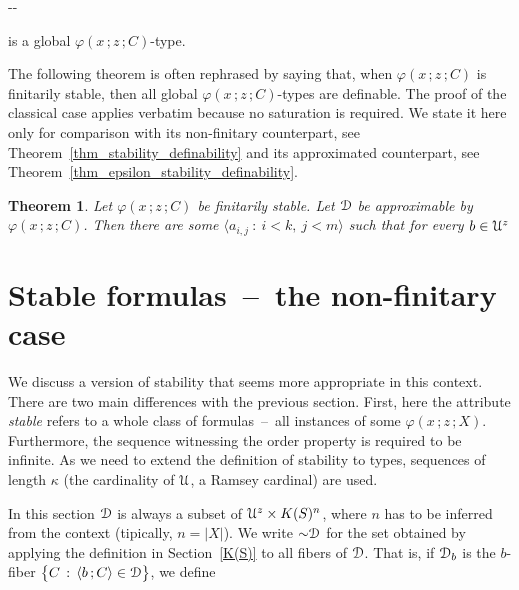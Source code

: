 \documentclass{amsproc}
\newcounter{thm}
\theoremstyle{mio}
\newtheorem{theorem}[thm]{Theorem}\tcolorboxenvironment{theorem}{mythm}
\begin{document}
  \noindent\kern-\kern-

is a global $\varphi(x\,;z\,;C)$-type.\smallskip

The following theorem is often rephrased by saying that, when $\varphi(x\,;z\,;C)$ is finitarily stable, then all global $\varphi(x\,;z\,;C)$-types are definable.
The proof of the classical case applies verbatim because no saturation is required.
We state it here only for comparison with its non-finitary counterpart, see Theorem~\ref{thm_stability_definability} and its approximated counterpart, see Theorem~\ref{thm_epsilon_stability_definability}.

\begin{theorem}
  Let $\varphi(x\,;z\,;C)$ be finitarily stable.
  Let ${\EuScript D}$ be approximable by $\varphi(x\,;z\,;C)$.
  Then there are some $\langle a_{i,j}\ :\ i< k,\ j<m\rangle$ such that for every $b\in{\EuScript U}^z$\medskip

\end{theorem}


\section{Stable formulas~--~the non-finitary case}
\def\medrel#1{\parbox{5ex}{\hfil $#1$}}
\def\ceq#1#2#3{\parbox[t]{22ex}{$\displaystyle #1$}\medrel{#2}{$\displaystyle #3$}}

We discuss a version of stability that seems more appropriate in this context.
There are two main differences with the previous section.
First, here the attribute \textit{stable\/} refers to a whole class of formulas~--~all instances of some $\varphi(x\,;z\,;X)$.
Furthermore, the sequence witnessing the order property is required to be infinite.
As we need to extend the definition of stability to types, sequences of length $\kappa$ (the cardinality of ${\EuScript U}$, a Ramsey cardinal) are used.

In this section  ${\EuScript D}$ is always a subset of ${\EuScript U}^z\times K(S)^n$, where $n$ has to be inferred from the context (tipically, $n=|X|$).
We write ${\sim}{\EuScript D}$ for the set obtained by applying the definition in Section~\ref{K(S)} to all fibers of ${\EuScript D}$.
That is, if ${\EuScript D}_b$ is the $b$-fiber $\big\{C\,:\,\langle b\,;C\rangle\in{\EuScript D}\big\}$, we define
\end{document}
